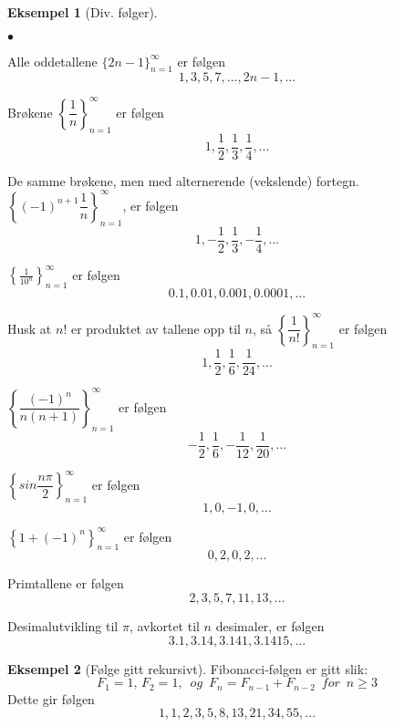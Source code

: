 \documentclass[11pt]{article}
\theoremstyle{definition}
\theoremstyle{definition}
\newtheorem{mitteks}{Eksempel}[section]
\newenvironment{fmitteks}
{\begin{mdframed}[style=minstil]\begin{mitteks}}
		{\end{mitteks}\end{mdframed}}
\theoremstyle{definition}
\theoremstyle{definition}
\theoremstyle{definition}
\theoremstyle{definition}
\begin{document}
	    \begin{mitteks}[Div. følger]
	    	\begin{list}{\(\bullet\)} \leavevmode
	    		\item Alle oddetallene \(\{2n-1\}^{\infty}_{n=1}\) er følgen \[1,3,5,7,...,2n-1,...\]
	    		\item Brøkene \(\left\lbrace \dfrac{1}{n} \right\rbrace^{\infty}_{n=1} \) er følgen 
	    		\[1,\frac{1}{2},\frac{1}{3},\frac{1}{4},...\]
	    		\item De samme brøkene, men med alternerende (vekslende) fortegn. 
	    		\(\left\lbrace (-1)^{n+1}\dfrac{1}{n} \right\rbrace^{\infty}_{n=1}\), er følgen 
	    		\[1,-\frac{1}{2},\frac{1}{3},-\frac{1}{4},...\]
	    		\item \(\left\lbrace \frac{1}{10^n}\right\rbrace^{\infty}_{n=1}  \) er følgen
	    		\[0.1,0.01,0.001,0.0001,...\]
	    		\item Husk at \(n!\) er produktet av tallene opp til \(n\), så \(\left\lbrace \dfrac{1}{n!} \right\rbrace^{\infty}_{n=1}\) er følgen \[1,\frac{1}{2},\frac{1}{6},\frac{1}{24},...\]
	    		\item \(\left\lbrace \dfrac{(-1)^n}{n(n+1)} \right\rbrace^{\infty}_{n=1}\) er følgen \[-\frac{1}{2},\frac{1}{6},-\frac{1}{12},\frac{1}{20},...\]
	    		\item \(\left\lbrace sin\dfrac{n\pi}{2} \right\rbrace ^{\infty}_{n=1}\) er følgen 
	    		\[1,0,-1,0,...\]
	    		\item \(\left\lbrace 1+(-1)^n \right\rbrace^{\infty}_{n=1}\) er følgen 
	    		\[0,2,0,2,...\]
	    		\item Primtallene er følgen \[2,3,5,7,11,13,...\]
	    		\item Desimalutvikling til \(\pi \), avkortet til \(n\) desimaler, er følgen \[3.1,3.14,3.141,3.1415,...\]
	    	\end{list}
	    \end{mitteks}
	    
	    \newpage
	    
	    \begin{fmitteks} [Følge gitt rekursivt] \leavevmode
	    	
	    	Fibonacci-følgen er gitt slik:
	    	\[F_1=1,\, F_2=1, \,\,\, og \,\,\, F_n=F_{n-1}+F_{n-2} \,\,\, for \,\,\, n\ge 3 \]
	    	Dette gir følgen
	    	\[1,1,2,3,5,8,13,21,34,55,...\]
	    \end{fmitteks}
	    
\end{document}
